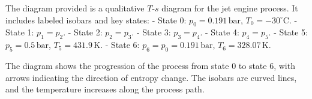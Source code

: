 The diagram provided is a qualitative \( T \)-\( s \) diagram for the jet engine process. It includes labeled isobars and key states:  
- State 0: \( p_0 = 0.191 \, \text{bar} \), \( T_0 = -30^\circ\text{C} \).  
- State 1: \( p_1 = p_2 \).  
- State 2: \( p_2 = p_3 \).  
- State 3: \( p_3 = p_4 \).  
- State 4: \( p_4 = p_5 \).  
- State 5: \( p_5 = 0.5 \, \text{bar} \), \( T_5 = 431.9 \, \text{K} \).  
- State 6: \( p_6 = p_0 = 0.191 \, \text{bar} \), \( T_6 = 328.07 \, \text{K} \).  

The diagram shows the progression of the process from state 0 to state 6, with arrows indicating the direction of entropy change. The isobars are curved lines, and the temperature increases along the process path.
